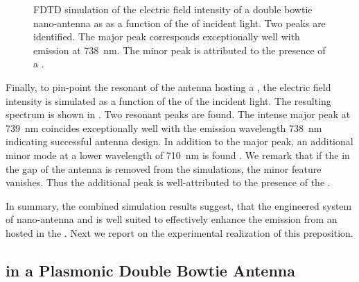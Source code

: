 		\begin{figure}[!htb]
				\centering
			\caption[Simulation of the resonance spectrum of a double bowtie antenna]{FDTD simulation of the electric field intensity of a double bowtie nano-antenna as as a function of the \wl of incident light. Two peaks are identified. The major peak corresponds exceptionally well with \siv emission at \SI{738}{nm}. The minor peak is attributed to the presence of a \nd \cite{Rahbany2015}.}
			\label{fig::antenna_fdtd_spectrum}
		\end{figure}

		Finally, to pin-point the resonant \wl of the antenna hosting a \nd, the electric field intensity is simulated as a function of the \wl of the incident light. The resulting spectrum is shown in . Two resonant peaks are found. The intense major peak at \SI{739}{nm} coincides exceptionally well with the \siv emission wavelength \SI{738}{nm} indicating successful antenna design. In addition to the major peak, an additional minor mode at a lower wavelength of \SI{710}{nm} is found \cite{rahbany2016towards}. We remark that if the \nd in the gap of the antenna is removed from the simulations, the minor feature vanishes. Thus the additional peak is well-attributed to the presence of the \nd.
		
		In summary, the combined simulation results suggest, that the engineered system of nano-antenna and \nd is well suited to effectively enhance the emission from an \siv hosted in the \nd. Next we report on the experimental realization of this preposition.

	\subsection{\SIV in a Plasmonic Double Bowtie Antenna}

